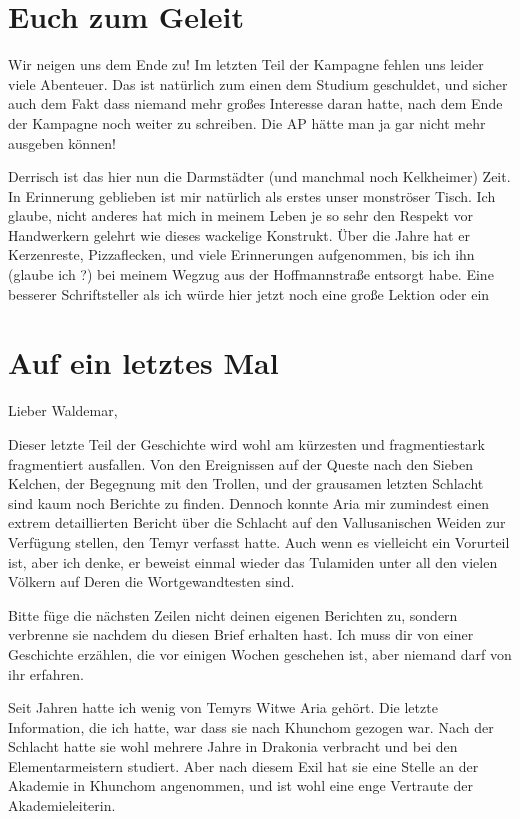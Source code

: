 \chapter{Euch zum Geleit}

Wir neigen uns dem Ende zu!
Im letzten Teil der Kampagne fehlen uns leider viele Abenteuer.
Das ist natürlich zum einen dem Studium geschuldet, und sicher auch dem Fakt dass niemand mehr großes Interesse daran hatte, nach dem Ende der Kampagne noch weiter zu schreiben.
Die AP hätte man ja gar nicht mehr ausgeben können!

Derrisch ist das hier nun die Darmstädter (und manchmal noch Kelkheimer) Zeit.
In Erinnerung geblieben ist mir natürlich als erstes unser monströser Tisch.
Ich glaube, nicht anderes hat mich in meinem Leben je so sehr den Respekt vor Handwerkern gelehrt wie dieses wackelige Konstrukt.
Über die Jahre hat er Kerzenreste, Pizzaflecken, und viele Erinnerungen aufgenommen, bis ich ihn (glaube ich ?) bei meinem Wegzug aus der Hoffmannstraße entsorgt habe.
Eine besserer Schriftsteller als ich würde hier jetzt noch eine große Lektion oder ein 


\chapter{Auf ein letztes Mal}

Lieber Waldemar,

Dieser letzte Teil der Geschichte wird wohl am kürzesten und fragmentiestark fragmentiert ausfallen. Von den Ereignissen auf der Queste nach den Sieben Kelchen, der Begegnung mit den Trollen, und der grausamen letzten Schlacht sind kaum noch Berichte zu finden.
Dennoch konnte Aria mir zumindest einen extrem detaillierten Bericht über die Schlacht auf den Vallusanischen Weiden zur Verfügung stellen, den Temyr verfasst hatte.
Auch wenn es vielleicht ein Vorurteil ist, aber ich denke, er beweist einmal wieder das Tulamiden unter all den vielen Völkern auf Deren die Wortgewandtesten sind.

Bitte füge die nächsten Zeilen nicht deinen eigenen Berichten zu, sondern verbrenne sie nachdem du diesen Brief erhalten hast. Ich muss dir von einer Geschichte erzählen, die vor einigen Wochen geschehen ist, aber niemand darf von ihr erfahren.

Seit Jahren hatte ich wenig von Temyrs Witwe Aria gehört. Die letzte Information, die ich hatte, war dass sie nach Khunchom gezogen war. Nach der Schlacht hatte sie wohl mehrere Jahre in Drakonia verbracht und bei den Elementarmeistern studiert. Aber nach diesem Exil hat sie eine Stelle an der Akademie in Khunchom angenommen, und ist wohl eine enge Vertraute der Akademieleiterin.


